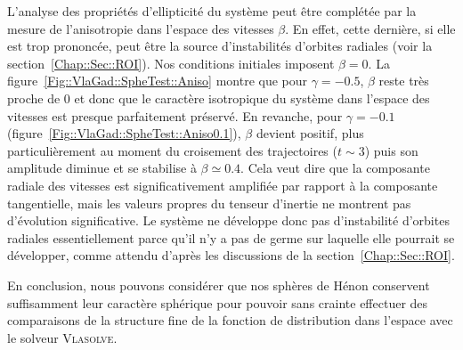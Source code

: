 		L'analyse des propriétés d'ellipticité du système peut être complétée par la
		mesure de l'anisotropie dans l'espace des vitesses $\beta$. En effet, cette dernière, si elle est trop prononcée, peut être la source d'instabilités
		d'orbites
		radiales (voir la section~\ref{Chap::Sec::ROI}). Nos conditions initiales imposent $\beta=0$. La figure~\ref{Fig::VlaGad::SpheTest::Aniso} montre que pour
		$\gamma=-0.5$, $\beta$ reste très proche de $0$ et donc que le caractère isotropique du système dans l'espace des vitesses est presque parfaitement
		préservé. En revanche, pour $\gamma=-0.1$ (figure~\ref{Fig::VlaGad::SpheTest::Aniso0.1}), $\beta$ devient positif, plus particulièrement au moment
		du croisement des trajectoires ($t\sim 3$) puis son amplitude diminue et se stabilise à $\beta\simeq0.4$.
		Cela veut dire que la composante radiale des vitesses est significativement amplifiée par rapport à la composante tangentielle,
		mais les valeurs propres du tenseur d'inertie ne montrent pas d'évolution significative. Le système ne développe donc pas d'instabilité d'orbites radiales
		essentiellement parce qu'il n'y a pas de germe sur laquelle elle pourrait se développer,
		comme attendu d'après les discussions de la
		section~\ref{Chap::Sec::ROI}.

		En conclusion, nous pouvons considérer que nos sphères de Hénon conservent suffisamment leur caractère sphérique pour pouvoir sans crainte effectuer
		des comparaisons de la structure fine de la fonction de distribution dans l'espace avec le solveur \textsc{Vlasolve}.




